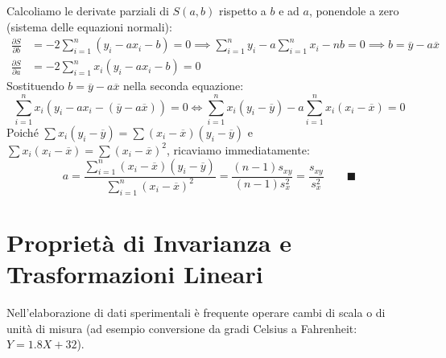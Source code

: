 \begin{dimostrazione}
Calcoliamo le derivate parziali di $S(a, b)$ rispetto a $b$ e ad $a$, ponendole a zero (sistema delle equazioni normali):
\begin{align}
\frac{\partial S}{\partial b} &= -2\sum_{i=1}^n (y_i - ax_i - b) = 0 \implies \sum_{i=1}^n y_i - a\sum_{i=1}^n x_i - nb = 0 \implies b = \overline{y} - a\overline{x} \\
\frac{\partial S}{\partial a} &= -2\sum_{i=1}^n x_i (y_i - ax_i - b) = 0
\end{align}
Sostituendo $b = \overline{y} - a\overline{x}$ nella seconda equazione:
\begin{equation}
\sum_{i=1}^n x_i \left( y_i - a x_i - (\overline{y} - a\overline{x}) \right) = 0 \iff \sum_{i=1}^n x_i (y_i - \overline{y}) - a \sum_{i=1}^n x_i (x_i - \overline{x}) = 0
\end{equation}
Poiché $\sum x_i (y_i - \overline{y}) = \sum (x_i - \overline{x})(y_i - \overline{y})$ e $\sum x_i (x_i - \overline{x}) = \sum (x_i - \overline{x})^2$, ricaviamo immediatamente:
\begin{equation}
a = \frac{\sum_{i=1}^n (x_i - \overline{x})(y_i - \overline{y})}{\sum_{i=1}^n (x_i - \overline{x})^2} = \frac{(n-1)s_{xy}}{(n-1)s_x^2} = \frac{s_{xy}}{s_x^2} \qquad \blacksquare
\end{equation}
\end{dimostrazione}

\section{Proprietà di Invarianza e Trasformazioni Lineari}
\label{sec:trasformazioni_lineari_descrittiva}

Nell'elaborazione di dati sperimentali è frequente operare cambi di scala o di unità di misura (ad esempio conversione da gradi Celsius a Fahrenheit: $Y = 1.8X + 32$).

